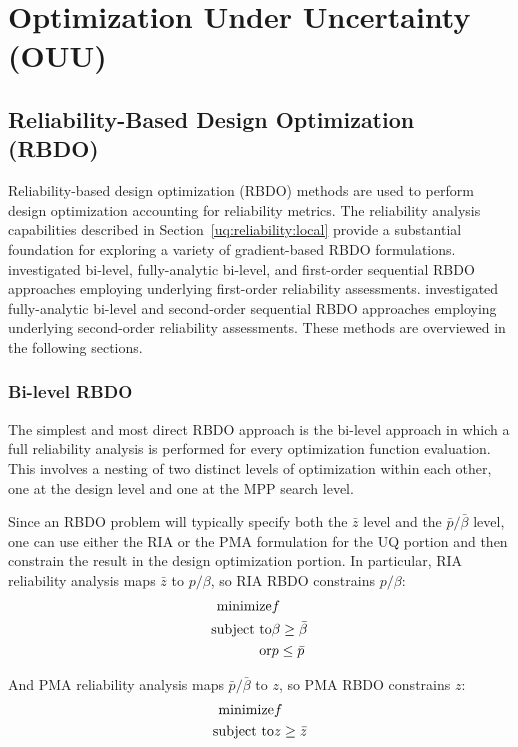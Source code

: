 \chapter{Optimization Under Uncertainty (OUU)}\label{ouu}

\section{Reliability-Based Design Optimization (RBDO)}\label{ouu:rbdo}

Reliability-based design optimization (RBDO) methods are used to
perform design optimization accounting for reliability metrics.  The
reliability analysis capabilities described in
Section~\ref{uq:reliability:local} provide a substantial foundation
for exploring a variety of gradient-based RBDO formulations.
\cite{Eld05} investigated bi-level, fully-analytic bi-level, and
first-order sequential RBDO approaches employing underlying
first-order reliability assessments.  \cite{Eld06a} investigated
fully-analytic bi-level and second-order sequential RBDO approaches
employing underlying second-order reliability assessments.  These
methods are overviewed in the following sections.

\subsection{Bi-level RBDO} \label{ouu:rbdo:bilev}

The simplest and most direct RBDO approach is the bi-level approach in
which a full reliability analysis is performed for every optimization
function evaluation.  This involves a nesting of two distinct levels
of optimization within each other, one at the design level and one at
the MPP search level.

Since an RBDO problem will typically specify both the $\bar{z}$ level
and the $\bar{p}/\bar{\beta}$ level, one can use either the RIA or the
PMA formulation for the UQ portion and then constrain the result in
the design optimization portion.  In particular, RIA reliability
analysis maps $\bar{z}$ to $p/\beta$, so RIA RBDO constrains $p/\beta$:
\begin{eqnarray}
  {\rm minimize }     & f \nonumber \\
  {\rm subject \ to } & \beta \ge \bar{\beta} \nonumber \\
  {\rm or }           & p \le \bar{p} \label{eq:rbdo_ria}
\end{eqnarray}

\noindent And PMA reliability analysis maps $\bar{p}/\bar{\beta}$ to 
$z$, so PMA RBDO constrains $z$:
\begin{eqnarray}
  {\rm minimize }     & f \nonumber \\
  {\rm subject \ to } & z \ge \bar{z} \label{eq:rbdo_pma}
\end{eqnarray}

